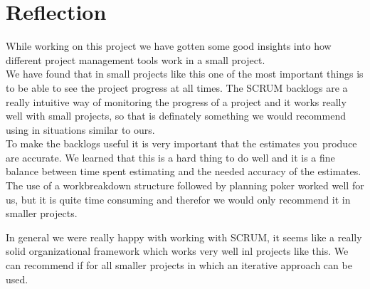 \section{Reflection}
While working on this project we have gotten some good insights into how different project management tools work in a small project.\\
We have found that in small projects like this one of the most important things is to be able to see the project progress at all times. The SCRUM backlogs are a really intuitive way of monitoring the progress of a project and it works really well with small projects, so that is definately something we would recommend using in situations similar to ours. \\
To make the backlogs useful it is very important that the estimates you produce are accurate. We learned that this is a hard thing to do well and it is a fine balance between time spent estimating and the needed accuracy of the estimates. The use of a workbreakdown structure followed by planning poker worked well for us, but it is quite time consuming and therefor we would only recommend it in smaller projects.

In general we were really happy with working with SCRUM, it seems like a really solid organizational framework which works very well inl projects like this. We can recommend if for all smaller projects in which an iterative approach can be used. 